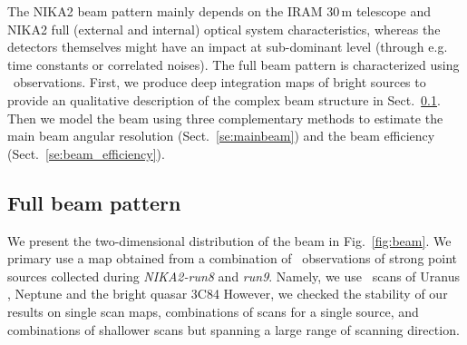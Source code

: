 
The NIKA2 beam pattern mainly depends on the IRAM 30\,m telescope and
NIKA2 full (external and internal) optical system characteristics,
whereas the detectors themselves might have an impact at sub-dominant
level (through e.g. time constants or correlated noises).
The full beam pattern is characterized using \bm\ observations. First,
we produce deep integration maps of bright sources to provide an
qualitative description of the complex beam structure in
Sect.~\ref{se:fullbeam}. Then we model the beam using three
complementary methods to estimate the main beam angular resolution
(Sect.~\ref{se:mainbeam}) and the beam efficiency
(Sect.~\ref{se:beam_efficiency}).

\subsection{Full beam pattern}
\label{se:fullbeam}

We present the two-dimensional distribution of the beam in
Fig.~\ref{fig:beam}. We primary use a map obtained from a combination
of \bm\ observations of strong point sources collected during
\emph{NIKA2-run8} and \emph{run9}. Namely, we use \bm\ scans
of Uranus %
,  Neptune %
and the bright quasar 3C84 %
However, we checked the stability of our results on single scan maps,
combinations of scans for a single source, and combinations of
shallower scans but spanning a large range of scanning direction.

